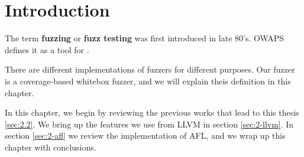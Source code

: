 \section{Introduction} \label{sec:2.1}

The term \textbf{fuzzing} or \textbf{fuzz testing} was first introduced in late 80's. OWAPS defines it as a tool for . \cite{owasp}

There are different implementations of fuzzers for different purposes. Our fuzzer is a coverage-based whitebox fuzzer, and we will explain theis definition in this chapter.

In this chapter, we begin by reviewing the previous works that lead to this thesis \ref{sec:2.2}. We bring up the features we use from LLVM in section \ref{sec:2-llvm}. In section \ref{sec:2-afl} we review the implementation of AFL, and we wrap up this chapter with conclusions.
